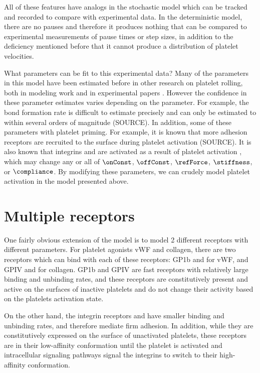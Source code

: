 All of these features have analogs in the stochastic model which can
be tracked and recorded to compare with experimental data. In the
deterministic model, there are no pauses and therefore it produces
nothing that can be compared to experimental measurements of pause
times or step sizes, in addition to the deficiency mentioned before
that it cannot produce a distribution of platelet velocities.

What parameters can be fit to this experimental data? Many of the
parameters in this model have been estimated before in other research
on platelet rolling, both in modeling work \cite{Fitzgibbon2014,
  Mody2008b, Wang2013} and in experimental papers \cite{Litvinov2011,
  Litvinov2012}. However the confidence in these parameter estimates
varies depending on the parameter. For example, the bond formation
rate is difficult to estimate precisely and can only be estimated to
within several orders of magnitude (SOURCE). In addition, some of
these parameters with platelet priming. For example, it is known that
more adhesion receptors are recruited to the surface during platelet
activation (SOURCE). It is also known that integrins 
and  are activated as a result of platelet activation
\cite{Kee2015}, which may change any or all of $\onConst$, $\offConst$,
$\refForce$, $\stiffness$, or $\compliance$. By modifying these
parameters, we can crudely model platelet activation in the model
presented above.

\section{Multiple receptors}
\label{sec:multiple-receptors}

One fairly obvious extension of the model is to model 2 different
receptors with different parameters. For platelet agonists vWF and
collagen, there are two receptors which can bind with each of these
receptors: GP1b and  for vWF, and GPIV and
 for collagen. GP1b and GPIV are fast receptors with
relatively large binding and unbinding rates, and these receptors are
constitutively present and active on the surfaces of inactive
platelets and do not change their activity based on the platelets
activation state.

On the other hand, the integrin receptors  and
 have smaller binding and unbinding rates, and therefore
mediate firm adhesion. In addition, while they are constitutively
expressed on the surface of unactivated platelets, these receptors are
in their low-affinity conformation until the platelet is activated and
intracellular signaling pathways signal the integrins to switch to
their high-affinity conformation.

